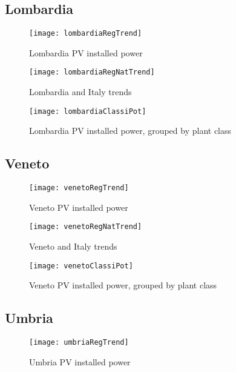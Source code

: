 \documentclass[12pt,a4paper,openright,twoside]{report}
\begin{document}
\subsection*{Lombardia}

\begin{figure}[hp]
	\centering
	\texttt{[image: lombardiaRegTrend]}
	\caption{Lombardia PV installed power}
	\label{lombardiaRegTrend}
\end{figure}

\begin{figure}[hp]
	\centering
	\texttt{[image: lombardiaRegNatTrend]}
	\caption{Lombardia and Italy trends}
	\label{lombardiaRegNatTrend}
\end{figure}

\begin{figure}[hp]
	\centering
	\texttt{[image: lombardiaClassiPot]}
	\caption{Lombardia PV installed power, grouped by plant class}
	\label{lombardiaClassiPot}
\end{figure}

\clearpage

\subsection*{Veneto}

\begin{figure}[hp]
	\centering
	\texttt{[image: venetoRegTrend]}
	\caption{Veneto PV installed power}
	\label{venetoRegTrend}
\end{figure}

\begin{figure}[hp]
	\centering
	\texttt{[image: venetoRegNatTrend]}
	\caption{Veneto and Italy trends}
	\label{venetoRegNatTrend}
\end{figure}

\clearpage

\begin{figure}[hp]
	\centering
	\texttt{[image: venetoClassiPot]}
	\caption{Veneto PV installed power, grouped by plant class}
	\label{venetoClassiPot}
\end{figure}



\subsection*{Umbria}

\begin{figure}[hp]
	\centering
	\texttt{[image: umbriaRegTrend]}
	\caption{Umbria PV installed power}
	\label{umbriaRegTrend}
\end{figure}
\end{document}
